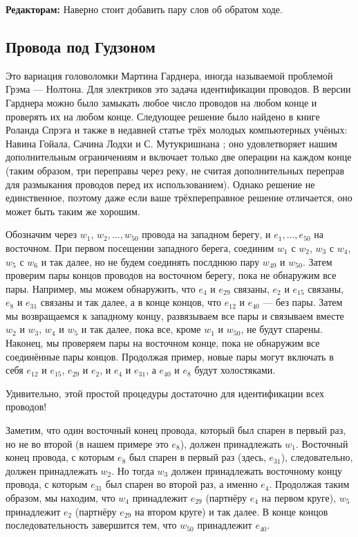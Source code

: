 \begin{addedbytheeditors}
\textbf{Редакторам:} Наверно стоит добавить пару слов об обратом ходе.
\end{addedbytheeditors}


\subsection*{Провода под Гудзоном}

Это вариация головоломки Мартина Гарднера, иногда называемой проблемой Грэма --- Нолтона.
Для электриков это задача идентификации проводов.
В версии Гарднера можно было замыкать любое число проводов на любом конце и проверять их на любом конце.
Следующее решение было найдено в книге Роланда Спрэга \cite{sprague} и также в недавней статье трёх молодых компьютерных учёных: Навина Гойала, Сачина Лодхи и С. Мутукришнана \cite{goyal-lodha-muthukrishnan}; оно удовлетворяет нашим дополнительным ограничениям и включает только две операции на каждом конце (таким образом, три переправы через реку, не считая дополнительных переправ для размыкания проводов перед их использованием).
Однако решение не единственное, поэтому даже если ваше трёхпереправное решение отличается, оно может быть таким же хорошим.

Обозначим через $w_1$, $w_2, \dots, w_{50}$ провода на западном берегу,
и $e_1, \dots, e_{50}$ на восточном. %
При первом посещении западного берега, соединим $w_1$ с $w_2$, $w_3$ с $w_4$, $w_5$ с $w_6$ и так далее, но не будем соединять послднюю пару $w_{49}$ и $w_{50}$.
Затем проверим пары концов проводов на восточном берегу, пока не обнаружим все пары.
Например, мы можем обнаружить, что $e_4$ и $e_{29}$ связаны, $e_2$ и $e_{15}$ связаны, $e_8$ и $e_{31}$ связаны и так далее, а в конце концов, что $e_{12}$ и $e_{40}$ --- без пары.
Затем мы возвращаемся к западному концу, развязываем все пары и связываем вместе $w_2$ и $w_3$, $w_4$ и $w_5$ и так далее, пока все, кроме $w_1$ и $w_{50}$, не будут спарены.
Наконец, мы проверяем пары на восточном конце, пока не обнаружим все соединённые пары концов.
Продолжая пример, новые пары могут включать в себя $e_{12}$ и $e_{15}$, $e_{29}$ и $e_2$, и $e_4$ и $e_{31}$, а $e_{40}$ и $e_8$ будут холостяками.

Удивительно, этой простой процедуры достаточно для идентификации всех проводов!

Заметим, что один восточный конец провода, который был спарен в первый раз, но не во второй (в нашем примере это $e_8$), должен принадлежать $w_1$.
Восточный конец провода, с которым $e_8$ был спарен в первый раз (здесь, $e_{31}$), следовательно, должен принадлежать $w_2$.
Но тогда $w_3$ должен принадлежать восточному концу провода, с которым $e_{31}$ был спарен во второй раз, а именно $e_4$.
Продолжая таким образом, мы находим, что $w_4$ принадлежит $e_{29}$ (партнёру $e_4$ на первом круге), $w_5$ принадлежит $e_2$ (партнёру $e_{29}$ на втором круге) и так далее.
В конце концов последовательность завершится тем, что $w_{50}$ принадлежит $e_{40}$.

